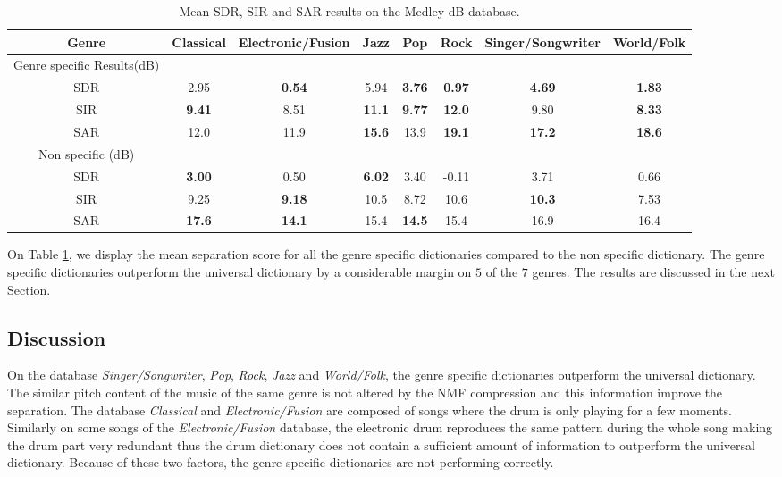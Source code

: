 \documentclass{article}
\begin{document}
\begin{table}
   
   \begin{tabular}{|c|c|c|c|c|c|c|c|}
\hline   
Genre & Classical & Electronic/Fusion & Jazz & Pop & Rock & Singer/Songwriter & World/Folk \\
\hline
Genre specific Results(dB)  & & & & & & & \\
SDR & 2.95     & \bf{0.54}& 5.94     & \bf{3.76}&\bf{0.97} &\bf{4.69} &\bf{1.83} \\
SIR & \bf{9.41}& 8.51     & \bf{11.1}& \bf{9.77}&\bf{12.0} & 9.80     &\bf{8.33} \\
SAR & 12.0     & 11.9     & \bf{15.6}& 13.9     &\bf{19.1} &\bf{17.2} &\bf{18.6} \\
\hline
Non specific (dB) & & & & & & &\\
SDR & \bf{3.00}& 0.50     & \bf{6.02}& 3.40     & -0.11    &  3.71    & 0.66 \\
SIR & 9.25     & \bf{9.18}& 10.5     & 8.72     & 10.6     &\bf{10.3} & 7.53 \\
SAR & \bf{17.6}& \bf{14.1}& 15.4     & \bf{14.5}& 15.4     & 16.9     & 16.4 \\
\hline
  \end{tabular} 
\caption{\label{specresults} Mean SDR, SIR and SAR results on the Medley-dB database.}
\end{table}



On Table \ref{specresults}, we display the mean separation score for all the genre specific dictionaries compared to the non specific dictionary. The genre specific dictionaries outperform the universal dictionary by a considerable margin on $5$ of the $7$ genres. The results are discussed in the next Section.


\subsection{Discussion}


On the database \emph{Singer/Songwriter}, \emph{Pop}, \emph{Rock}, \emph{Jazz} and \emph{World/Folk}, the genre specific dictionaries outperform the universal dictionary. The similar pitch content of the music of the same genre is not altered by the NMF compression and this information improve the separation.  
The database \emph{Classical} and \emph{Electronic/Fusion} are composed of songs where the drum is only playing for a few moments. Similarly on some songs of the \emph{Electronic/Fusion} database, the electronic drum reproduces the same pattern during the whole song making the drum part very redundant thus the drum dictionary does not contain a sufficient amount of information to outperform the universal dictionary. Because of these two factors, the genre specific dictionaries are not performing correctly.
\end{document}
